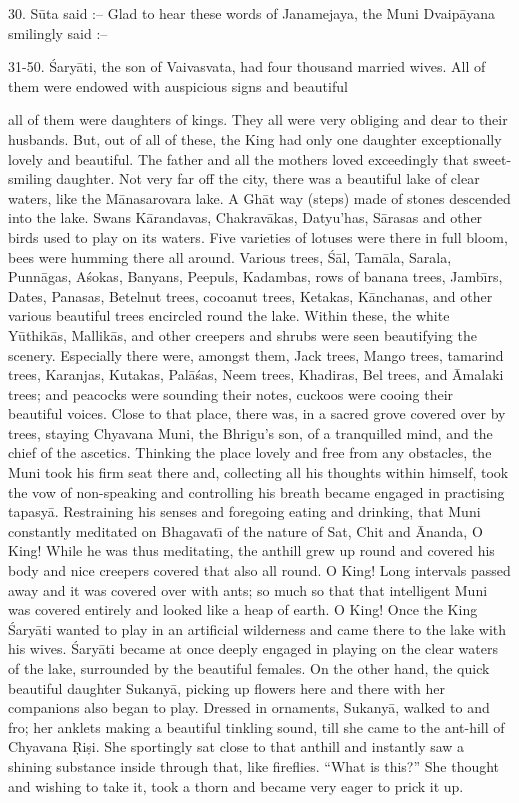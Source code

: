 30. S\=uta said :-- Glad to hear these words of Janamejaya, the Muni Dvaip\=ayana smilingly said :--

31-50. \'Sary\=ati, the son of Vaivasvata, had four thousand married wives. All of them were endowed with auspicious signs and beautiful

all of them were daughters of kings. They all were very obliging and dear to their husbands. But, out of all of these, the King had only one daughter exceptionally lovely and beautiful. The father and all the mothers loved exceedingly that sweet-smiling daughter. Not very far off the city, there was a beautiful lake of clear waters, like the M\=anasarovara lake. A Gh\=at way (steps) made of stones descended into the lake. Swans K\=arandavas, Chakrav\=akas, Datyu'has, S\=arasas and other birds used to play on its waters. Five varieties of lotuses were there in full bloom, bees were humming there all around. Various trees, \'S\=al, Tam\=ala, Sarala, Punn\=agas, A\'sokas, Banyans, Peepuls, Kadambas, rows of banana trees, Jamb\={\i}rs, Dates, Panasas, Betelnut trees, cocoanut trees, Ketakas, K\=anchanas, and other various beautiful trees encircled round the lake. Within these, the white Y\=uthik\=as, Mallik\=as, and other creepers and shrubs were seen beautifying the scenery. Especially there were, amongst them, Jack trees, Mango trees, tamarind trees, Karanjas, Kutakas, Pal\=a\'sas, Neem trees, Khadiras, Bel trees, and \=Amalaki trees; and peacocks were sounding their notes, cuckoos were cooing their beautiful voices. Close to that place, there was, in a sacred grove covered over by trees, staying Chyavana Muni, the Bhrigu's son, of a tranquilled mind, and the chief of the ascetics. Thinking the place lovely and free from any obstacles, the Muni took his firm seat there and, collecting all his thoughts within himself, took the vow of non-speaking and controlling his breath became engaged in practising tapasy\=a. Restraining his senses and foregoing eating and drinking, that Muni constantly meditated on Bhagavat\={\i} of the nature of Sat, Chit and \=Ananda, O King! While he was thus meditating, the anthill grew up round and covered his body and nice creepers covered that also all round. O King! Long intervals passed away and it was covered over with ants; so much so that that intelligent Muni was covered entirely and looked like a heap of earth. O King! Once the King \'Sary\=ati wanted to play in an artificial wilderness and came there to the lake with his wives. \'Sary\=ati became at once deeply engaged in playing on the clear waters of the lake, surrounded by the beautiful females. On the other hand, the quick beautiful daughter Sukany\=a, picking up flowers here and there with her companions also began to play. Dressed in ornaments, Sukany\=a, walked to and fro; her anklets making a beautiful tinkling sound, till she came to the ant-hill of Chyavana \d{R}i\d{s}i. She sportingly sat close to that anthill and instantly saw a shining substance inside through that, like fireflies. ``What is this?'' She thought and wishing to take it, took a thorn and became very eager to prick it up.

